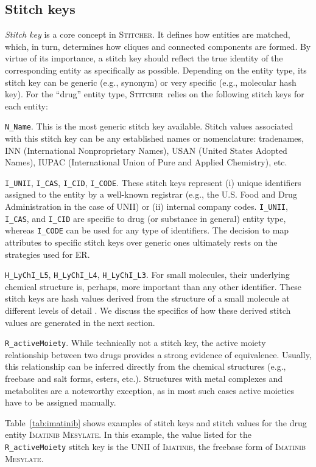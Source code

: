 \documentclass{bmcart}
\newcommand\st{\textsc{Stitcher}}
\begin{document}
\subsection*{Stitch keys}\label{sec:stitch-keys}
\emph{Stitch key} is a core concept in \st. It defines how entities are
matched, which, in turn, determines how cliques and connected
components are formed. By virtue of its importance, a stitch key
should reflect the true identity of the corresponding entity as
specifically as possible. Depending on the entity type, its stitch key
can be generic (e.g., synonym) or very specific (e.g., molecular hash
key). For the ``drug'' entity type, \st\ relies on the following
stitch keys for each entity:  
\begin{description}
\item{\texttt{N\_Name}.} This is the most generic stitch key
available. Stitch values associated with this stitch key can be any
established names or nomenclature: tradenames, INN
(International Nonproprietary Names), USAN (United States Adopted
Names), IUPAC (International Union of Pure and Applied Chemistry), etc. 
\item{\texttt{I\_UNII}, \texttt{I\_CAS}, \texttt{I\_CID}, \texttt{I\_CODE}.}
These stitch keys represent (i) unique identifiers assigned to the entity by
a well-known registrar (e.g., the U.S. Food and Drug Administration in
the case of UNII) or (ii) internal company codes. \texttt{I\_UNII},
\texttt{I\_CAS}, and \texttt{I\_CID} are specific to drug (or
substance in general) entity type, whereas \texttt{I\_CODE} can be
used for any type of identifiers. The decision to map attributes to
specific stitch keys over generic ones ultimately rests on the
strategies used for ER.
\item{\texttt{H\_LyChI\_L5}, \texttt{H\_LyChI\_L4}, \texttt{H\_LyChI\_L3}.}
For small molecules, their underlying chemical structure is, 
perhaps, more important than any other identifier. These
stitch keys are hash values derived from the structure of a small molecule at
different levels of detail \cite{lychi}. We discuss the specifics of how these
derived stitch values are generated in the next section.
\item{\texttt{R\_activeMoiety}.} While technically not a stitch key, the
active moiety relationship between two drugs provides a strong
evidence of equivalence. Usually, this relationship can be inferred
directly from the chemical structures (e.g., freebase and salt forms,
esters, etc.). Structures with metal complexes and metabolites are a
noteworthy exception, as in most such cases active moieties have to be
assigned manually. 
\end{description}
Table~\ref{tab:imatinib} shows examples of stitch keys and stitch values for
the drug entity \textsc{Imatinib Mesylate}. In this example,
the value listed for the \texttt{R\_activeMoiety} stitch key is the UNII of 
\textsc{Imatinib}, the freebase form of \textsc{Imatinib Mesylate}.
\end{document}

